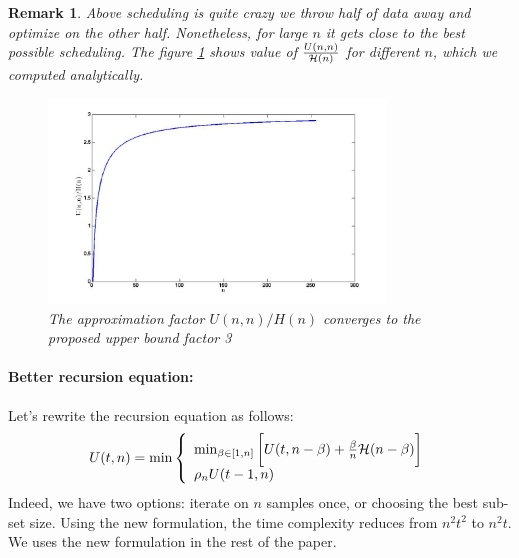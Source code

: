 \documentclass{article}
\newtheorem{remark}[definition]{Remark}
\newcommand{\bound}{{\cal H}}
\begin{document}
\begin{remark}
	Above scheduling is quite crazy we throw half of data away and
	optimize on the other half. Nonetheless, for large $n$ it gets close to the
	best possible scheduling. The figure \ref{fig:fast_converge_plot} shows value of 
	$\frac{U(n,n)}{\bound(n)}$ for different $n$, which we computed analytically. 
	\begin{figure}
\center
\includegraphics[width=0.8\textwidth]{fast_converge_plot.jpg} 
\caption{The approximation factor $U(n,n)/H(n)$ converges to the proposed upper
bound factor 3}
\label{fig:fast_converge_plot}
\end{figure}
\end{remark}


\paragraph{Better recursion equation:}
Let's rewrite the recursion equation as follows: 
\begin{equation} \label{eqn:cracking}
	U(t,n) = \min
\left\{
	\begin{array}{ll}
		\min_{\beta \in [1,n]} \bigg[U(t,n-\beta) + \frac{\beta}{n} \bound(n-\beta)
		\bigg]\\
		\rho_n U(t-1,n)
	\end{array}
\right.
\end{equation}
Indeed, we have two options: iterate on $n$ samples once, or choosing the best
sub-set size. Using the new formulation, the time
complexity reduces from $n^2t^2$ to $n^2 t$. We uses the new formulation in the
rest of the paper. 
\end{document}
